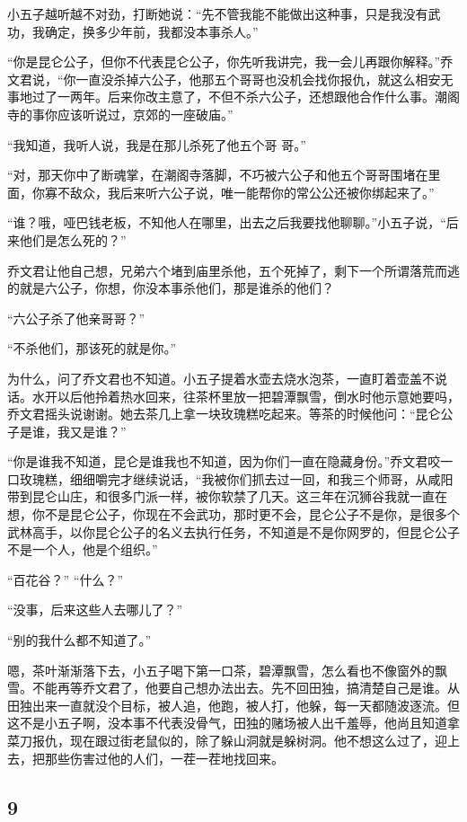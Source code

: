 小五子越听越不对劲，打断她说：“先不管我能不能做出这种事，只是我没有武功，我确定，换多少年前，我都没本事杀人。”

“你是昆仑公子，但你不代表昆仑公子，你先听我讲完，我一会儿再跟你解释。”乔文君说，“你一直没杀掉六公子，他那五个哥哥也没机会找你报仇，就这么相安无事地过了一两年。后来你改主意了，不但不杀六公子，还想跟他合作什么事。潮阁寺的事你应该听说过，京郊的一座破庙。”

“我知道，我听人说，我是在那儿杀死了他五个哥
哥。”

“对，那天你中了断魂掌，在潮阁寺落脚，不巧被六公子和他五个哥哥围堵在里面，你寡不敌众，我后来听六公子说，唯一能帮你的常公公还被你绑起来了。”

“谁？哦，哑巴钱老板，不知他人在哪里，出去之后我要找他聊聊。”小五子说，“后来他们是怎么死的？”

乔文君让他自己想，兄弟六个堵到庙里杀他，五个死掉了，剩下一个所谓落荒而逃的就是六公子，你想，你没本事杀他们，那是谁杀的他们？

“六公子杀了他亲哥哥？”

“不杀他们，那该死的就是你。”

为什么，问了乔文君也不知道。小五子提着水壶去烧水泡茶，一直盯着壶盖不说话。水开以后他拎着热水回来，往茶杯里放一把碧潭飘雪，倒水时他示意她要吗，乔文君摇头说谢谢。她去茶几上拿一块玫瑰糕吃起来。等茶的时候他问：“昆仑公子是谁，我又是谁？”

“你是谁我不知道，昆仑是谁我也不知道，因为你们一直在隐藏身份。”乔文君咬一口玫瑰糕，细细嚼完才继续说话，“我被你们抓去过一回，和我三个师哥，从咸阳带到昆仑山庄，和很多门派一样，被你软禁了几天。这三年在沉狮谷我就一直在想，你不是昆仑公子，你现在不会武功，那时更不会，昆仑公子不是你，是很多个武林高手，以你昆仑公子的名义去执行任务，不知道是不是你网罗的，但昆仑公子不是一个人，他是个组织。”

“百花谷？” “什么？”

“没事，后来这些人去哪儿了？”

“别的我什么都不知道了。”

嗯，茶叶渐渐落下去，小五子喝下第一口茶，碧潭飘雪，怎么看也不像窗外的飘雪。不能再等乔文君了，他要自己想办法出去。先不回田独，搞清楚自己是谁。从田独出来一直就没个目标，被人追，他跑，被人打，他躲，每一天都随波逐流。但这不是小五子啊，没本事不代表没骨气，田独的赌场被人出千羞辱，他尚且知道拿菜刀报仇，现在跟过街老鼠似的，除了躲山洞就是躲树洞。他不想这么过了，迎上去，把那些伤害过他的人们，一茬一茬地找回来。
\newline

{\centering\subsection{9}}

